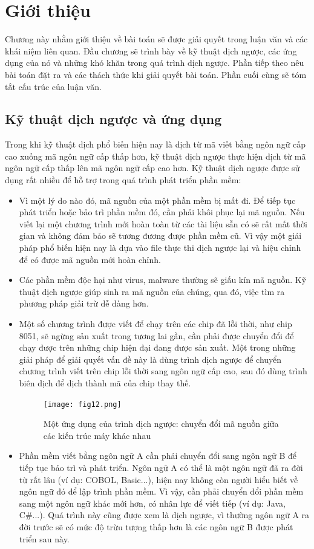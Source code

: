 \chapter{Giới thiệu}
\label{sec:gioithieu}


Chương này nhằm giới thiệu về bài toán sẽ được giải quyết trong luận văn và các khái niệm liên quan. Đầu chương sẽ trình bày về kỹ thuật dịch ngược, các ứng dụng của nó và những khó khăn trong quá trình dịch ngược. Phần tiếp theo nêu bài toán đặt ra và các thách thức khi giải quyết bài toán. Phần cuối cùng sẽ tóm tắt cấu trúc của luận văn.

\section{Kỹ thuật dịch ngược và ứng dụng}
Trong khi kỹ thuật dịch phổ biến hiện nay là dịch từ mã viết bằng ngôn ngữ cấp cao xuống mã ngôn ngữ cấp thấp hơn, kỹ thuật dịch ngược thực hiện dịch từ mã ngôn ngữ cấp thấp lên mã ngôn ngữ cấp cao hơn. Kỹ thuật dịch ngược được sử dụng rất nhiều để hỗ trợ trong quá trình phát triển phần mềm:

\begin{itemize}
	\item Vì một lý do nào đó, mã nguồn của một phần mềm bị mất đi. Để tiếp tục phát triển hoặc bảo trì phần mềm đó, cần phải khôi phục lại mã nguồn. Nếu viết lại một chương trình mới hoàn toàn từ các tài liệu sẵn có sẽ rất mất thời gian và không đảm bảo sẽ tương đương được phần mềm cũ. Vì vậy một giải pháp phổ biến hiện nay là dựa vào file thực thi dịch ngược lại và hiệu chỉnh để có được mã nguồn mới hoàn chỉnh.
	\item Các phần mềm độc hại như virus, malware thường sẽ giấu kín mã nguồn. Kỹ thuật dịch ngược giúp sinh ra mã nguồn của chúng, qua đó, việc tìm ra phương pháp giải trừ dễ dàng hơn.
	\item Một số chương trình được viết để chạy trên các chip đã lỗi thời, như chip 8051, sẽ ngừng sản xuất trong tương lai gần, cần phải được chuyển đổi để chạy được trên những chip hiện đại đang được sản xuất. Một trong những giải pháp để giải quyết vấn đề này là dùng trình dịch ngược để chuyển chương trình viết trên chip lỗi thời sang ngôn ngữ cấp cao, sau đó dùng trình biên dịch để dịch thành mã của chip thay thế.
	
	\begin{figure}[h]
		\centering
		\texttt{[image: fig12.png]}
		\caption{Một ứng dụng của trình dịch ngược: chuyển đổi mã nguồn giữa các kiến trúc máy khác nhau}
	\end{figure}
	\item Phần mềm viết bằng ngôn ngữ A cần phải chuyển đổi sang ngôn ngữ B để tiếp tục bảo trì và phát triển. Ngôn ngữ A có thể là một ngôn ngữ đã ra đời từ rất lâu (ví dụ: COBOL, Basic...), hiện nay không còn người hiểu biết về ngôn ngữ đó để lập trình phần mềm. Vì vậy, cần phải chuyển đổi phần mềm sang một ngôn ngữ khác mới hơn, có nhân lực để viết tiếp (ví dụ: Java, C\#...). Quá trình này cũng được xem là dịch ngược, vì thường ngôn ngữ A ra đời trước sẽ có mức độ trừu tượng thấp hơn là các ngôn ngữ B được phát triển sau này.
\end{itemize}

